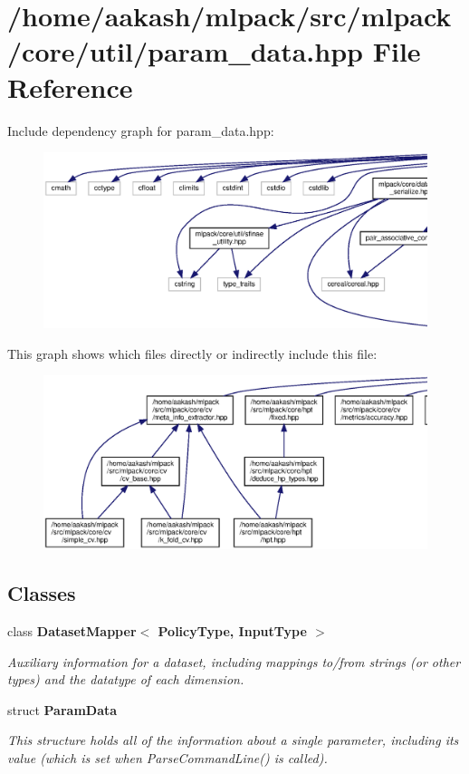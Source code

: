 \section{/home/aakash/mlpack/src/mlpack/core/util/param\+\_\+data.hpp File Reference}
\label{param__data_8hpp}
Include dependency graph for param\+\_\+data.\+hpp\+:
\nopagebreak
\begin{figure}[H]
\begin{center}
\leavevmode
\includegraphics[width=350pt]{param__data_8hpp__incl}
\end{center}
\end{figure}
This graph shows which files directly or indirectly include this file\+:
\nopagebreak
\begin{figure}[H]
\begin{center}
\leavevmode
\includegraphics[width=350pt]{param__data_8hpp__dep__incl}
\end{center}
\end{figure}
\subsection*{Classes}
\begin{DoxyCompactItemize}
\item 
class \textbf{ Dataset\+Mapper$<$ Policy\+Type, Input\+Type $>$}
\begin{DoxyCompactList}\small\item\em Auxiliary information for a dataset, including mappings to/from strings (or other types) and the datatype of each dimension. \end{DoxyCompactList}\item 
struct \textbf{ Param\+Data}
\begin{DoxyCompactList}\small\item\em This structure holds all of the information about a single parameter, including its value (which is set when Parse\+Command\+Line() is called). \end{DoxyCompactList}\end{DoxyCompactItemize}

